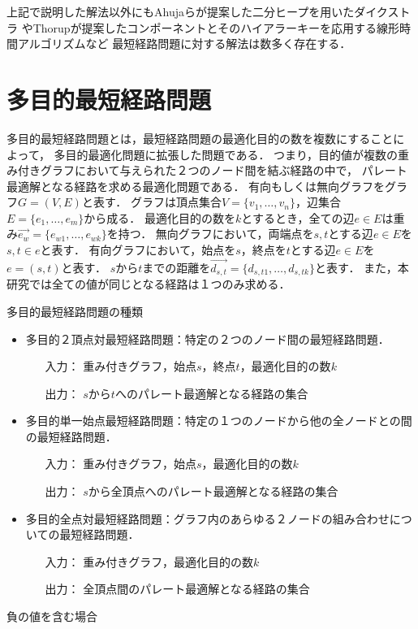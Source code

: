 \documentclass[12pt]{optlab-bachelor}
\begin{document}
上記で説明した解法以外にもAhujaら\cite{Ahuja}が提案した二分ヒープを用いたダイクストラ
やThorup\cite{Thorup}が提案したコンポーネントとそのハイアラーキーを応用する線形時間アルゴリズムなど
最短経路問題に対する解法は数多く存在する．

\section{多目的最短経路問題}
多目的最短経路問題とは，最短経路問題の最適化目的の数を複数にすることによって，
多目的最適化問題に拡張した問題である．
つまり，目的値が複数の重み付きグラフにおいて与えられた２つのノード間を結ぶ経路の中で，
パレート最適解となる経路を求める最適化問題である．
有向もしくは無向グラフをグラフ$G=(V,E)$と表す．
グラフは頂点集合$V=\{v_1,\ldots,v_n\}$，辺集合$E=\{e_1,\ldots,e_m\}$から成る．
最適化目的の数を$k$とするとき，全ての辺$e\in E$は重み$\vec{e_w} = \{e_{w1},\ldots,e_{wk}\}$を持つ．
無向グラフにおいて，両端点を$s,t$とする辺$e \in E$を$s,t \in e$と表す．
有向グラフにおいて，始点を$s$，終点を$t$とする辺$e \in E$を$e=(s,t)$と表す．
$s$から$t$までの距離を$\vec{d_{s,t}} = \{d_{s,t1},\ldots,d_{s,tk}\}$と表す．
また，本研究では全ての値が同じとなる経路は１つのみ求める．
\begin{description}
  \item[多目的最短経路問題の種類]
\end{description}
\begin{itemize}
\item 多目的２頂点対最短経路問題：特定の２つのノード間の最短経路問題．
  \begin{itemize}
    \item[入力：]重み付きグラフ，始点$s$，終点$t$，最適化目的の数$k$
    \item[出力：]$s$から$t$へのパレート最適解となる経路の集合
  \end{itemize}
  \item 多目的単一始点最短経路問題：特定の１つのノードから他の全ノードとの間の最短経路問題．
  \begin{itemize}
    \item[入力：]重み付きグラフ，始点$s$，最適化目的の数$k$
    \item[出力：]$s$から全頂点へのパレート最適解となる経路の集合
  \end{itemize}
  \item 多目的全点対最短経路問題：グラフ内のあらゆる２ノードの組み合わせについての最短経路問題．
  \begin{itemize}
    \item[入力：]重み付きグラフ，最適化目的の数$k$
    \item[出力：]全頂点間のパレート最適解となる経路の集合
  \end{itemize}
\end{itemize}
\begin{description}
  \item[負の値を含む場合]
\end{description}
\end{document}
